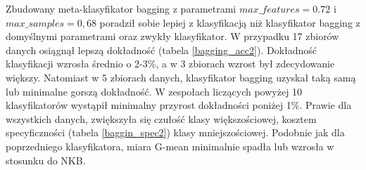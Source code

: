 Zbudowany meta-klasyfikator bagging z parametrami $max\_features=0.72$ i $max\_samples=0,68$ poradził sobie lepiej z klasyfikacją niż klasyfikator bagging z domyślnymi parametrami oraz zwykły klasyfikator. W przypadku 17 zbiorów danych osiągnął lepszą dokładność (tabela \ref{bagging_acc2}). Dokładność klasyfikacji wzrosła średnio o 2-3\%, a w 3 zbiorach wzrost był zdecydowanie większy. Natomiast w 5 zbiorach danych, klasyfikator bagging uzyskał taką samą lub minimalne gorszą dokładność. W zespołach liczących powyżej 10 klasyfikatorów wystąpił minimalny przyrost dokładności poniżej 1\%. Prawie dla wszystkich danych, zwiększyła się czułość klasy większościowej, kosztem specyficzności (tabela \ref{baggin_spec2}) klasy mniejszościowej. Podobnie jak dla poprzedniego klasyfikatora, miara G-mean minimalnie spadła lub wzrosła w stosunku do NKB.
\begin{table}[H]
	\tiny
	\begin{center}
\end{center}
\end{table}
